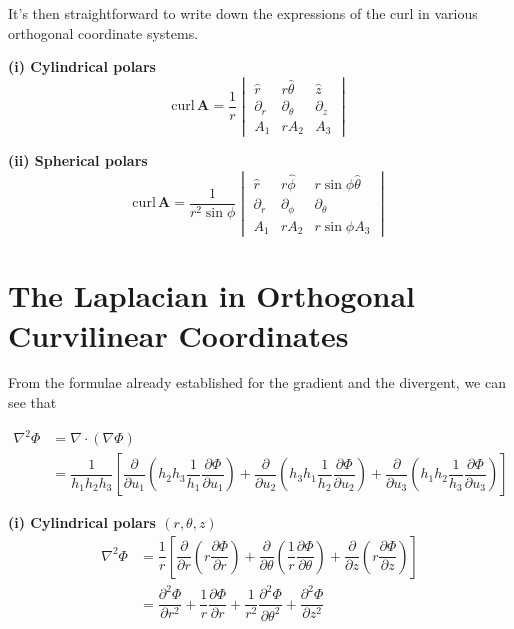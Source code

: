 It's then straightforward to write down the expressions of the  curl in various orthogonal coordinate systems.

\textbf{(i) Cylindrical polars}
\[
  \mathrm{curl}\,\mathbf A = 
  \dfrac{1}{r}
  \begin{vmatrix}
  \hat r & r\hat \theta & \hat z\\
  \partial _r & \partial _\theta &\partial _z\\
  A_1 & rA_2 & A_3	
  \end{vmatrix}
\]

\textbf{(ii) Spherical polars}
\[
  \mathrm{curl}\,\mathbf A = \dfrac{1}{r^2\sin\phi} 
  \begin{vmatrix}
  	\hat r & r\hat \phi & r\sin\phi \hat \theta\\
  	\partial _r & \partial _\phi & \partial _\theta\\
  	A_1 & rA_2 & r\sin\phi A_3
  \end{vmatrix}
\]

\section{The Laplacian in Orthogonal Curvilinear Coordinates}
From the formulae already established for the gradient and the  divergent, we can see that 

\begin{prop}
\begin{align*}
  \nabla^2\Phi 
  &= \nabla \cdot(\nabla \Phi)\\
  &= \dfrac{1}{h_1h_2h_3}\left[\dfrac{\partial }{\partial u_1}(h_2h_3\dfrac{1}{h_1}\dfrac{\partial \Phi}{\partial u_1}) + \dfrac{\partial }{\partial u_2}(h_3h_1\dfrac{1}{h_2}\dfrac{\partial \Phi}{\partial u_2}) + \dfrac{\partial }{\partial u_3}(h_1h_2\dfrac{1}{h_3}\dfrac{\partial \Phi}{\partial u_3})\right]
\end{align*}
\end{prop}


\textbf{(i) Cylindrical polars $(r,\theta,z)$}
\begin{align*}
  \nabla^2\Phi 
  &= \dfrac{1}{r}\left[\dfrac{\partial }{\partial r}\left(r\dfrac{\partial \Phi}{\partial r}\right) + \dfrac{\partial }{\partial \theta}\left(\dfrac{1}{r}\dfrac{\partial \Phi}{\partial \theta}\right) + \dfrac{\partial }{\partial z}\left(r \dfrac{\partial \Phi}{\partial z}\right)\right]\\[.2cm]
  &= \dfrac{\partial ^2\Phi}{\partial r^2} + \dfrac{1}{r}\dfrac{\partial \Phi}{\partial r} + \dfrac{1}{r^2}\dfrac{\partial ^2\Phi}{\partial \theta^2} + \dfrac{\partial ^2\Phi}{\partial z^2}
\end{align*}

